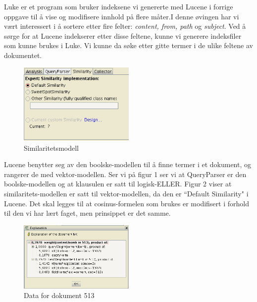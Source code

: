 Luke er et program som bruker indeksene vi genererte med Lucene i forrige oppgave til å vise og modifisere innhold på flere måter.\footnotemark[1] I denne øvingen har vi vært interessert i å sortere etter fire felter: \textit{content, from, path} og  \textit{subject}. Ved å sørge for at Lucene indekserer etter disse feltene, kunne vi generere indeksfiler som kunne brukes i Luke. Vi kunne da søke etter gitte termer i de ulike feltene av dokumentet.\\\hfill

\begin{figure}
\centering
\includegraphics[width=0.5\textwidth]{images/similarity.png}
\caption{Similaritetsmodell}
\label{fig:similarity}
\end{figure}

Lucene benytter seg av den boolske-modellen til å finne termer i et dokument, og rangerer de med vektor-modellen. Ser vi på figur 1 ser vi at QueryParser er den boolske-modellen og at klausulen er satt til logisk-ELLER. Figur 2 viser at similaritets-modellen er satt til vektor-modellen, da den er ``Default Similarity" i Lucene. Det skal legges til at cosinus-formelen som brukes er modifisert i forhold til den vi har lært faget, men prinsippet er det samme.\footnotemark[2]\\\hfill 

\begin{figure}
\centering
\includegraphics[width=0.5\textwidth]{images/numbers.png}
\caption{Data for dokument 513}
\label{fig:numbers}
\end{figure}

